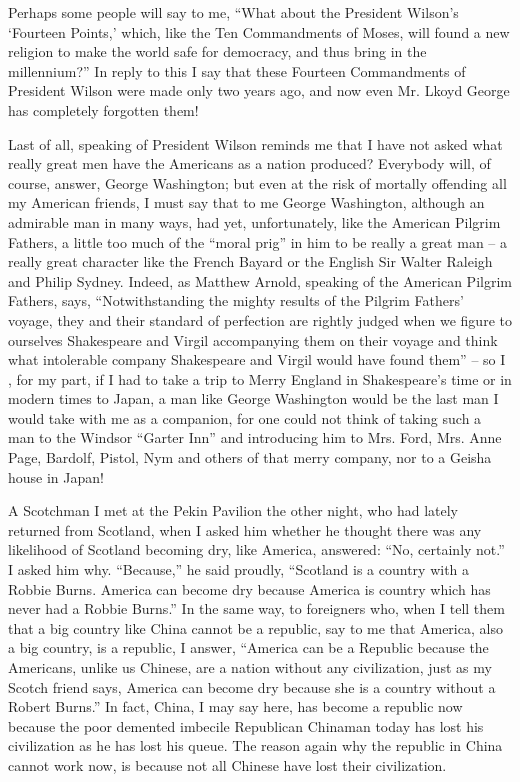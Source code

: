 Perhaps some people will say to me,
``What about the President Wilson's `Fourteen Points,'
which, like the Ten Commandments of Moses, will found a new religion to make the world safe for democracy,
and thus bring in the millennium?''
In reply to this I say that these Fourteen Commandments of President Wilson were made only two years ago,
and now even Mr. Lkoyd George has completely forgotten them! 

Last of all, speaking of President Wilson reminds me
that I have not asked what really great men have the Americans as a nation produced?
Everybody will, of course, answer, George Washington;
but even at the risk of mortally offending all my American friends,
I must say that to me George Washington,
although an admirable man in many ways, had yet, unfortunately,
like the American Pilgrim Fathers, a little too much of the ``moral prig'' in him to be really a great man
-- a really great character like the French Bayard or the English Sir Walter Raleigh and Philip Sydney.
Indeed, as Matthew Arnold, speaking of the American Pilgrim Fathers, says,
``Notwithstanding the mighty results of the Pilgrim Fathers' voyage,
they and their standard of perfection are rightly judged when we figure to ourselves Shakespeare and Virgil accompanying them on their voyage and think what intolerable company Shakespeare and Virgil would have found them''
-- so I , for my part, if I had to take a trip to Merry England in Shakespeare's time or in modern times to Japan, a man like George Washington would be the last man I would take with me as a companion,
for one could not think of taking such a man to the Windsor ``Garter Inn'' and introducing him to Mrs. Ford, Mrs. Anne Page, Bardolf, Pistol, Nym and others of that merry company, nor to a Geisha house in Japan! 

A Scotchman I met at the Pekin Pavilion the other night, who had lately returned from Scotland,
when I asked him whether he thought there was any likelihood of Scotland becoming dry,
like America, answered: ``No, certainly not.'' I asked him why.
``Because,'' he said proudly,
``Scotland is a country with a Robbie Burns. America can become dry because America is country which has never had a Robbie Burns.''
In the same way, to foreigners who, when I tell them that a big country like China cannot be a republic, say to me that America, also a big country, is a republic,
I answer, ``America can be a Republic because the Americans, unlike us Chinese, are a nation without any civilization, just as my Scotch friend says,
America can become dry because she is a country without a Robert Burns.''
In fact, China, I may say here, has become a republic now because the poor demented imbecile Republican Chinaman today has lost his civilization as he has lost his queue.
The reason again why the republic in China cannot work now,
is because not all Chinese have lost their civilization.

